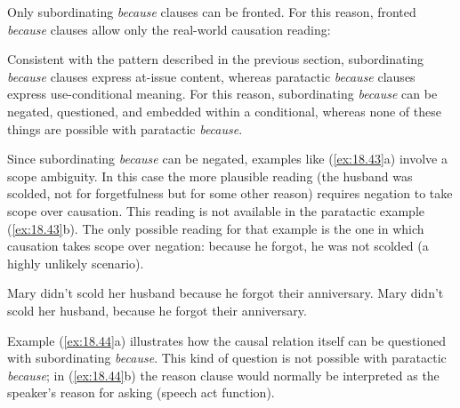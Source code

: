 \ea \label{ex:18.42}
 \z
\z


Only subordinating \textit{because} clauses can be fronted. For this reason, fronted \textit{because} clauses allow only the real-world causation reading:


\ea \label{ex:18.15}
                       \z
\z


Consistent with the pattern described in the previous section, subordinating \textit{because} clauses express at-issue content, whereas paratactic \textit{because} clauses express use-conditional meaning. For this reason, subordinating \textit{because} can be negated, questioned, and embedded within a conditional, whereas none of these things are possible with paratactic \textit{because}.

\begin{sloppypar}
Since subordinating \textit{because} can be negated, examples like (\ref{ex:18.43}a) involve a scope ambiguity. In this case the more plausible reading (the husband was scolded, not for forgetfulness but for some other reason) requires negation to take scope over causation. This reading is not available in the paratactic example (\ref{ex:18.43}b). The only possible reading for that example is the one in which causation takes scope over negation: because he forgot, he was not scolded (a highly unlikely scenario).
\end{sloppypar}\largerpage[2]

\ea \label{ex:18.43}
\ea  Mary didn’t scold her husband because he forgot their anniversary.
\ex Mary didn’t scold her husband, because he forgot their anniversary.
                       \z
\z


Example (\ref{ex:18.44}a) illustrates how the causal relation itself can be questioned with subordinating \textit{because}. This kind of question is not possible with paratactic \textit{because}; in (\ref{ex:18.44}b) the reason clause would normally be interpreted as the speaker’s reason for asking (speech act function).



